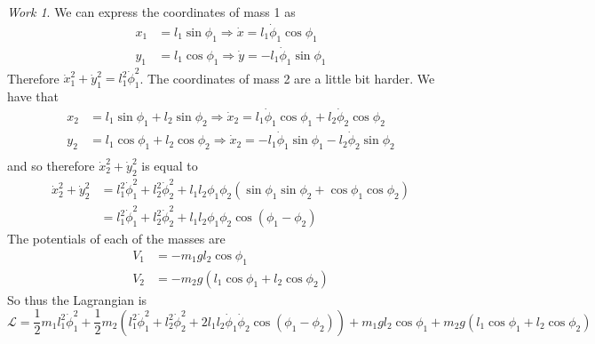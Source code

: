 \documentclass{article}
\theoremstyle{definition}
\theoremstyle{remark}
\newtheorem*{work}{Work}
\begin{document}
\begin{work}
    We can express the coordinates of mass 1 as 
    \begin{equation*}
        \begin{split}
            x_1 &= l_1 \sin \phi_1 \Rightarrow \dot x =l_1 \dot \phi_1 \cos \phi_1 \\
            y_1 &= l_1 \cos \phi_1 \Rightarrow \dot y = -l_1 \dot \phi_1 \sin \phi_1
        \end{split}
    \end{equation*}
    Therefore $\dot x^2_1 +\dot y^2_1 = l_1^2 \dot \phi_1^2$. The coordinates of mass 2 are a little bit harder. We have that 
    \begin{equation*}
        \begin{split}
            x_2 &= l_1 \sin \phi_1 +l_2 \sin\phi_2 \Rightarrow \dot x_2 = l_1\dot \phi_1\cos \phi_1 +l_2 \dot \phi_2 \cos \phi_2 \\
            y_2 &= l_1 \cos \phi_1 +l_2 \cos\phi_2 \Rightarrow \dot x_2 = -l_1\dot \phi_1\sin \phi_1 -l_2 \dot \phi_2 \sin \phi_2 \\
        \end{split}
    \end{equation*}
    and so therefore $\dot x^2_2 + \dot y_2^2 $ is equal to 
    \begin{equation*}
        \begin{split}
            \dot x^2_2 + \dot y_2^2 &= l_1^2\dot\phi_1^2 + l_2^2\dot \phi_2^2 + l_1l_2\phi_1 \phi_2 (\sin \phi_1 \sin \phi_2 + \cos \phi_1 \cos \phi_2) \\
            &=l_1^2\dot\phi_1^2 + l_2^2\dot \phi_2^2 + l_1l_2\phi_1 \phi_2 \cos(\phi_1 - \phi_2)
        \end{split}
    \end{equation*}
    The potentials of each of the masses are 
    \begin{equation*}
        \begin{split}
            V_1 &= -m_1gl_2 \cos \phi_1 \\
            V_2 &= -m_2g(l_1 \cos \phi_1 +l_2 \cos \phi_2)
        \end{split}
    \end{equation*}
    So thus the Lagrangian is 
    \begin{equation*}
        \mathscr{L} = \frac{1}{2} m_1 l_1^2 \dot \phi_1^2 + \frac{1}{2}m_2(l_1^2\dot \phi_1^2+l_2^2\dot \phi_2^2 + 2l_1l_2\dot \phi_1\dot\phi_2\cos(\phi_1-\phi_2)) + m_1gl_2\cos \phi_1 +m_2g(l_1\cos \phi_1 + l_2\cos\phi_2)
    \end{equation*}
\end{work}
\end{document}
